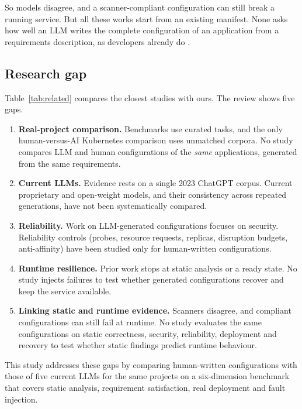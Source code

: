 So models disagree, and a scanner-compliant configuration can still break a running service. But all these works start from an existing manifest. None asks how well an LLM writes the complete configuration of an application from a requirements description, as developers already do \citep{zhang2024genaismells}.

\subsection{Research gap}\label{sec:lit-gap}

Table~\ref{tab:related} compares the closest studies with ours. The review shows five gaps.
\begin{enumerate}
    \item \textbf{Real-project comparison.} Benchmarks use curated tasks, and the only human-versus-AI Kubernetes comparison uses unmatched corpora. No study compares LLM and human configurations of the \emph{same} applications, generated from the same requirements.
    \item \textbf{Current LLMs.} Evidence rests on a single 2023 ChatGPT corpus. Current proprietary and open-weight models, and their consistency across repeated generations, have not been systematically compared.
    \item \textbf{Reliability.} Work on LLM-generated configurations focuses on security. Reliability controls (probes, resource requests, replicas, disruption budgets, anti-affinity) have been studied only for human-written configurations.
    \item \textbf{Runtime resilience.} Prior work stops at static analysis or a ready state. No study injects failures to test whether generated configurations recover and keep the service available.
    \item \textbf{Linking static and runtime evidence.} Scanners disagree, and compliant configurations can still fail at runtime. No study evaluates the same configurations on static correctness, security, reliability, deployment and recovery to test whether static findings predict runtime behaviour.
\end{enumerate}
This study addresses these gaps by comparing human-written configurations with those of five current LLMs for the same projects on a six-dimension benchmark that covers static analysis, requirement satisfaction, real deployment and fault injection.
